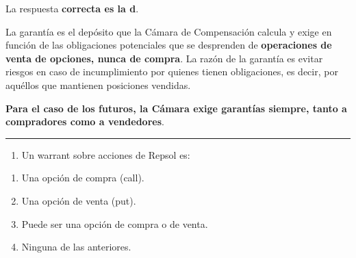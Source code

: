 \documentclass[
  letterpaper,
  DIV=11,
  numbers=noendperiod]{scrreprt}
\providecommand{\tightlist}{%
  \setlength{\itemsep}{0pt}\setlength{\parskip}{0pt}}\usepackage{longtable,booktabs,array}
\begin{document}
\begin{tcolorbox}[enhanced jigsaw, left=2mm, opacityback=0, colback=white, breakable, arc=.35mm, bottomrule=.15mm, rightrule=.15mm, toprule=.15mm, leftrule=.75mm, colframe=quarto-callout-tip-color-frame]
\begin{minipage}[t]{5.5mm}
\textcolor{quarto-callout-tip-color}{\faLightbulb}
\end{minipage}%
\begin{minipage}[t]{\textwidth - 5.5mm}

La respuesta \textbf{correcta es la d}.

La garantía es el depósito que la Cámara de Compensación calcula y exige
en función de las obligaciones potenciales que se desprenden de
\textbf{operaciones de venta de opciones, nunca de compra}. La razón de
la garantía es evitar riesgos en caso de incumplimiento por quienes
tienen obligaciones, es decir, por aquéllos que mantienen posiciones
vendidas.

\textbf{Para el caso de los futuros, la Cámara exige garantías siempre,
tanto a compradores como a vendedores}.

\end{minipage}%
\end{tcolorbox}

\begin{center}\rule{0.5\linewidth}{0.5pt}\end{center}

\begin{enumerate}
\def\labelenumi{\arabic{enumi}.}
\setcounter{enumi}{32}
\tightlist
\item
  Un warrant sobre acciones de Repsol es:
\end{enumerate}

\begin{enumerate}
\def\labelenumi{\alph{enumi})}
\item
  Una opción de compra (call).
\item
  Una opción de venta (put).
\item
  Puede ser una opción de compra o de venta.
\item
  Ninguna de las anteriores.
\end{enumerate}
\end{document}
